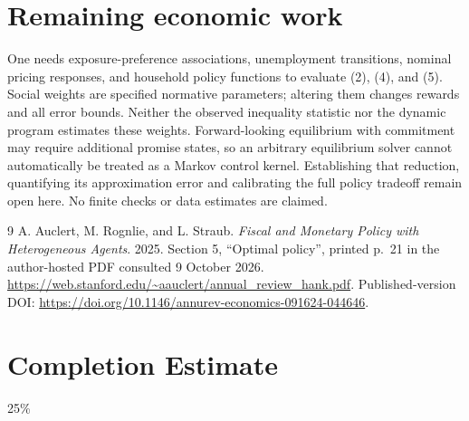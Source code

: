 \documentclass[11pt]{article}
\theoremstyle{remark}
\begin{document}
\section{Remaining economic work}
One needs exposure-preference associations, unemployment transitions,
nominal pricing responses, and household policy functions to evaluate
(2), (4), and (5). Social weights are specified normative parameters;
altering them changes rewards and all error bounds. Neither the observed
inequality statistic nor the dynamic program estimates these weights.
Forward-looking equilibrium with commitment may require additional promise
states, so an arbitrary equilibrium solver cannot automatically be treated
as a Markov control kernel. Establishing that reduction, quantifying its
approximation error and calibrating the full policy tradeoff remain open
here. No finite checks or data estimates are claimed.

\begin{thebibliography}{9}
 A. Auclert, M. Rognlie, and L. Straub.
\emph{Fiscal and Monetary Policy with Heterogeneous Agents}. 2025.
Section 5, ``Optimal policy'', printed p.~21 in the author-hosted PDF
consulted 9 October 2026.
\url{https://web.stanford.edu/~aauclert/annual_review_hank.pdf}.
Published-version DOI: \url{https://doi.org/10.1146/annurev-economics-091624-044646}.
\end{thebibliography}

\section{Completion Estimate}
25\%
\end{document}
